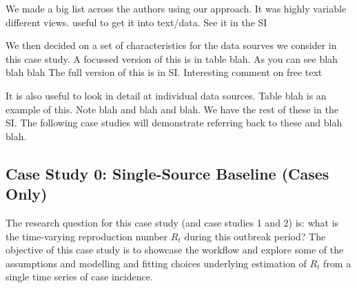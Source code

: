 \documentclass{article}
\begin{document}
We made a big list across the authors using our approach. It was highly variable different views. useful to get it into text/data. See it in the SI

We then decided on a set of characteristics for the data sourves we consider in this case study. A focussed version of this is in table blah. As you can see blah blah blah
The full version of this is in SI. Interesting comment on free text

It is also useful to look in detail at individual data sources. Table blah is an example of this. Note blah and blah and blah.
We have the rest of these in the SI. 
The following case studies will demonstrate referring back to these and blah blah.



\subsection{Case Study 0: Single-Source Baseline (Cases Only)}


The research question for this case study (and case studies 1 and 2) is: what is the time-varying reproduction number $R_t$ during this outbreak period?
The objective of this case study is to showcase the workflow and explore some of the assumptions and modelling and fitting choices underlying estimation of $R_t$ from a single time series of case incidence.



\end{document}
